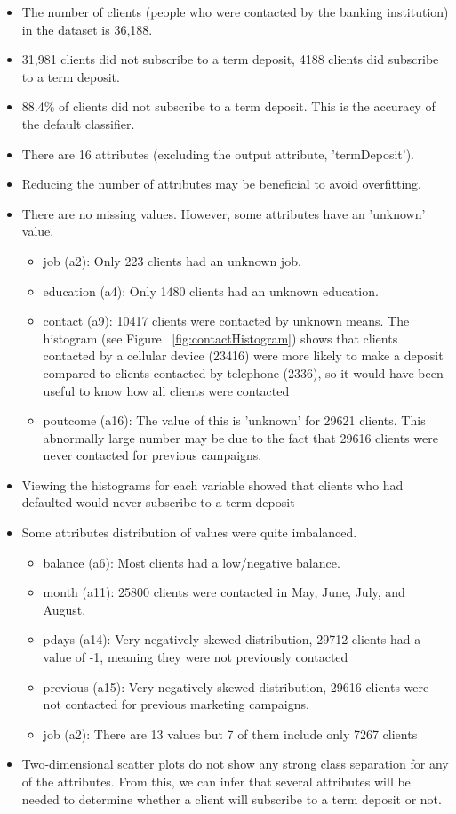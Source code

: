 \documentclass[a4paper,11pt]{article}
\begin{document}
\begin{itemize}
  \item{The number of clients (people who were contacted by the banking institution) in
  the dataset is 36,188.}
  \item{31,981 clients did not subscribe to a term deposit, 4188 clients did subscribe to a term deposit.}
  \item{88.4\% of clients did not subscribe to a term deposit. This is the accuracy of the default classifier.} 
  \item{There are 16 attributes (excluding the output attribute, 'termDeposit').}
  \item{Reducing the number of attributes may be beneficial to avoid overfitting.}
  \item{There are no missing values. However, some attributes have an 'unknown' value.}
  \begin{itemize}
    \item{job (a2): Only 223 clients had an unknown job.}
    \item{education (a4): Only 1480 clients had an unknown education.}
    \item{contact (a9): 10417 clients were contacted by unknown means. The histogram (see Figure ~\ref{fig:contactHistogram}) shows
    that clients contacted by a cellular device (23416) were more likely to make a deposit
    compared to clients contacted by telephone (2336), so it would have been useful to know how
    all clients were contacted}
    \item{poutcome (a16): The value of this is 'unknown' for 29621 clients. This abnormally
    large number may be due to the fact that 29616 clients were never contacted for previous campaigns.}
  \end{itemize}
  \item{Viewing the histograms for each variable showed that clients who had defaulted
  would never subscribe to a term deposit}
  \item{Some attributes distribution of values were quite imbalanced.}
  \begin{itemize}
      \item{balance (a6): Most clients had a low/negative balance.}
      \item{month (a11): 25800 clients were contacted in May, June, July, and August.}
      \item{pdays (a14): Very negatively skewed distribution, 29712 clients had a value of -1,
      meaning they were not previously contacted}
      \item{previous (a15): Very negatively skewed distribution, 29616 clients were not contacted for
      previous marketing campaigns.}
      \item{job (a2): There are 13 values but 7 of them include only 7267 clients}
  \end{itemize}
  \item{Two-dimensional scatter plots do not show any strong class separation for any of the attributes.
  From this, we can infer that several attributes will be needed to determine whether a client will
  subscribe to a term deposit or not.}
\end{itemize}
\end{document}
